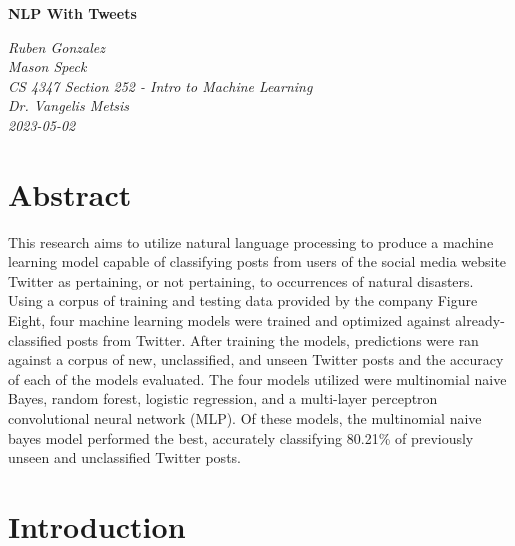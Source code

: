 \documentclass[11pt]{article}
\def\Title#1{\begin{center} {\Large {\bf #1} } \end{center}}
\begin{document}
\Title{NLP With Tweets}

\bigskip\bigskip

\begin{raggedright}

{\it
Ruben Gonzalez\\
Mason Speck\\
CS 4347 Section 252 - Intro to Machine Learning\\
Dr. Vangelis Metsis\\
2023-05-02
}
\bigskip\bigskip
\end{raggedright}


\section{Abstract}


This research aims to utilize natural language processing to produce a machine learning model capable of classifying posts from users of the social media website Twitter as pertaining, or not pertaining, to occurrences of natural disasters. Using a corpus of training and testing data provided by the company Figure Eight, four machine learning models were trained and optimized against already-classified posts from Twitter. After training the models, predictions were ran against a corpus of new, unclassified, and unseen Twitter posts and the accuracy of each of the models evaluated. The four models utilized were multinomial naive Bayes, random forest, logistic regression, and a multi-layer perceptron convolutional neural network (MLP). Of these models, the multinomial naive bayes model performed the best, accurately classifying 80.21\% of previously unseen and unclassified Twitter posts.

\section{Introduction}


\end{document}
